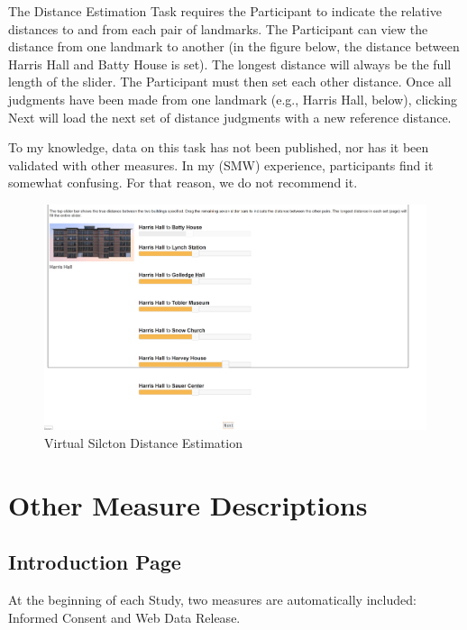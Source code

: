 \documentclass[
  12pt,
]{book}
\begin{document}
The Distance Estimation Task requires the Participant to indicate the relative distances to and from each pair of landmarks. The Participant can view the distance from one landmark to another (in the figure below, the distance between Harris Hall and Batty House is set). The longest distance will always be the full length of the slider. The Participant must then set each other distance. Once all judgments have been made from one landmark (e.g., Harris Hall, below), clicking Next will load the next set of distance judgments with a new reference distance.

To my knowledge, data on this task has not been published, nor has it been validated with other measures. In my (SMW) experience, participants find it somewhat confusing. For that reason, we do not recommend it.

\begin{figure}
\centering
\includegraphics{./figs/Distance_Estimation.png}
\caption{Virtual Silcton Distance Estimation}
\end{figure}

\hypertarget{other-measure-descriptions}{%
\chapter{Other Measure Descriptions}\label{other-measure-descriptions}}

\hypertarget{introduction-page}{%
\section{Introduction Page}\label{introduction-page}}

At the beginning of each Study, two measures are automatically included: Informed Consent and Web Data Release.
\end{document}
